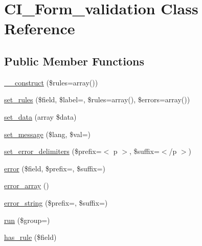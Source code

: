 \hypertarget{class_c_i___form__validation}{}\section{C\+I\+\_\+\+Form\+\_\+validation Class Reference}
\label{class_c_i___form__validation}
\subsection*{Public Member Functions}
\begin{DoxyCompactItemize}
\item 
\mbox{\hyperlink{class_c_i___form__validation_ac7224a1f92da249b312d1400c459ba83}{\+\_\+\+\_\+construct}} (\$rules=array())
\item 
\mbox{\hyperlink{class_c_i___form__validation_a7583f6c0643a979fbc5734c7b6e9fbe9}{set\+\_\+rules}} (\$field, \$label=\textquotesingle{}\textquotesingle{}, \$rules=array(), \$errors=array())
\item 
\mbox{\hyperlink{class_c_i___form__validation_af211c000380b8b345c6eb102cb5ca453}{set\+\_\+data}} (array \$data)
\item 
\mbox{\hyperlink{class_c_i___form__validation_a5a0dc4d3aef1f228155320a1d5275895}{set\+\_\+message}} (\$lang, \$val=\textquotesingle{}\textquotesingle{})
\item 
\mbox{\hyperlink{class_c_i___form__validation_ac45ddc321a1c1e5d5aad6e11f1f29b9c}{set\+\_\+error\+\_\+delimiters}} (\$prefix=\textquotesingle{}$<$ p $>$\textquotesingle{}, \$suffix=\textquotesingle{}$<$/p $>$\textquotesingle{})
\item 
\mbox{\hyperlink{class_c_i___form__validation_ae249cb0a67da61052921cf2880876cc1}{error}} (\$field, \$prefix=\textquotesingle{}\textquotesingle{}, \$suffix=\textquotesingle{}\textquotesingle{})
\item 
\mbox{\hyperlink{class_c_i___form__validation_a477a3b8cbc925367d5b6880c48a9b42a}{error\+\_\+array}} ()
\item 
\mbox{\hyperlink{class_c_i___form__validation_a63271bfb23c2963bed80f44fe9c27b09}{error\+\_\+string}} (\$prefix=\textquotesingle{}\textquotesingle{}, \$suffix=\textquotesingle{}\textquotesingle{})
\item 
\mbox{\hyperlink{class_c_i___form__validation_a304567453dbe1809dc0dc3ad99918383}{run}} (\$group=\textquotesingle{}\textquotesingle{})
\item 
\mbox{\hyperlink{class_c_i___form__validation_aaf0ef71d3e9ac390f52441f27e4b7786}{has\+\_\+rule}} (\$field)

\end{DoxyCompactItemize}
